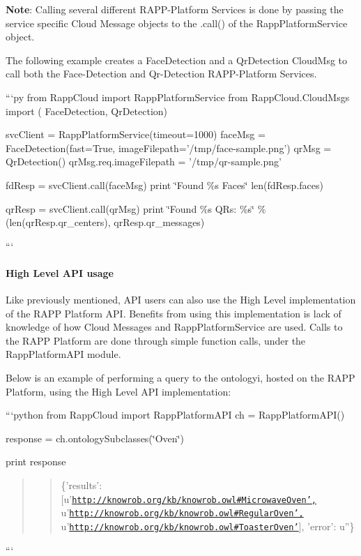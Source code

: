 {\bfseries Note}\-: Calling several different R\-A\-P\-P-\/\-Platform Services is done by passing the service specific Cloud Message objects to the {\ttfamily .call()} of the {\ttfamily Rapp\-Platform\-Service} object.

The following example creates a {\ttfamily Face\-Detection} and a {\ttfamily Qr\-Detection} Cloud\-Msg to call both the Face-\/\-Detection and Qr-\/\-Detection R\-A\-P\-P-\/\-Platform Services.

```py from Rapp\-Cloud import Rapp\-Platform\-Service from Rapp\-Cloud.\-Cloud\-Msgs import ( Face\-Detection, Qr\-Detection)

svc\-Client = Rapp\-Platform\-Service(timeout=1000) face\-Msg = Face\-Detection(fast=True, image\-Filepath='/tmp/face-\/sample.png') qr\-Msg = Qr\-Detection() qr\-Msg.\-req.\-image\-Filepath = '/tmp/qr-\/sample.png'

fd\-Resp = svc\-Client.\-call(face\-Msg) print \char`\"{}\-Found \%s Faces\char`\"{} len(fd\-Resp.\-faces)

qr\-Resp = svc\-Client.\-call(qr\-Msg) print \char`\"{}\-Found \%s Q\-Rs\-: \%s\char`\"{} \%(len(qr\-Resp.\-qr\-\_\-centers), qr\-Resp.\-qr\-\_\-messages)

```

\paragraph*{High Level A\-P\-I usage}

Like previously mentioned, A\-P\-I users can also use the High Level implementation of the R\-A\-P\-P Platform A\-P\-I. Benefits from using this implementation is lack of knowledge of how Cloud Messages and Rapp\-Platform\-Service are used. Calls to the R\-A\-P\-P Platform are done through simple function calls, under the Rapp\-Platform\-A\-P\-I module.

Below is an example of performing a query to the ontologyi, hosted on the R\-A\-P\-P Platform, using the High Level A\-P\-I implementation\-:

```python from Rapp\-Cloud import Rapp\-Platform\-A\-P\-I ch = Rapp\-Platform\-A\-P\-I()

response = ch.\-ontology\-Subclasses(\char`\"{}\-Oven\char`\"{})

print response \begin{quotation}
\begin{quotation}
\{'results'\-: \mbox{[}u'\href{http://knowrob.org/kb/knowrob.owl#MicrowaveOven',}{\tt http\-://knowrob.\-org/kb/knowrob.\-owl\#\-Microwave\-Oven',} u'\href{http://knowrob.org/kb/knowrob.owl#RegularOven',}{\tt http\-://knowrob.\-org/kb/knowrob.\-owl\#\-Regular\-Oven',} u'\href{http://knowrob.org/kb/knowrob.owl#ToasterOven'}{\tt http\-://knowrob.\-org/kb/knowrob.\-owl\#\-Toaster\-Oven'}\mbox{]}, 'error'\-: u''\}

\end{quotation}


\end{quotation}
```

